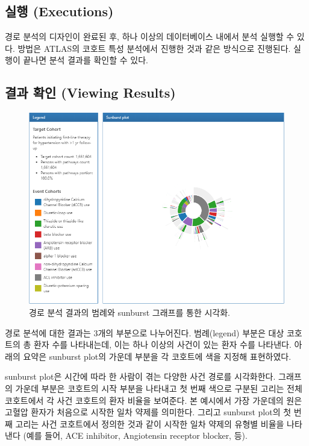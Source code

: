 \documentclass[11pt]{book}
\theoremstyle{definition}
\theoremstyle{definition}
\theoremstyle{definition}
\theoremstyle{remark}
\begin{document}
\subsection{실행 (Executions)}\label{-executions-1}

경로 분석의 디자인이 완료된 후, 하나 이상의 데이터베이스 내에서 분석
실행할 수 있다. 방법은 ATLAS의 코호트 특성 분석에서 진행한 것과 같은
방식으로 진행된다. 실행이 끝나면 분석 결과를 확인할 수 있다.

\subsection{결과 확인 (Viewing Results)}\label{--viewing-results}

\begin{figure}

{\centering \includegraphics[width=1\linewidth]{images/Characterization/atlasPathwaysResults} 

}

\caption{경로 분석 결과의 범례와 sunburst 그래프를 통한 시각화.}\label{fig:atlasPathwaysResults}
\end{figure}

경로 분석에 대한 결과는 3개의 부분으로 나누어진다. 범례(legend) 부분은
대상 코호트의 총 환자 수를 나타내는데, 이는 하나 이상의 사건이 있는 환자
수를 나타낸다. 아래의 요약은 sunburst plot의 가운데 부분을 각 코호트에
색을 지정해 표현하였다.

sunburst plot은 시간에 따라 한 사람이 겪는 다양한 사건 경로를
시각화한다. 그래프의 가운데 부분은 코호트의 시작 부분을 나타내고 첫 번째
색으로 구분된 고리는 전체 코호트에서 각 사건 코호트의 환자 비율을
보여준다. 본 예시에서 가장 가운데의 원은 고혈압 환자가 처음으로 시작한
일차 약제를 의미한다. 그리고 sunburst plot의 첫 번째 고리는 사건
코호트에서 정의한 것과 같이 시작한 일차 약제의 유형별 비율을 나타낸다
(예를 들어, ACE inhibitor, Angiotensin receptor blocker, 등).
\end{document}
